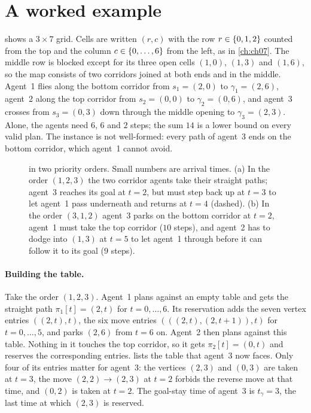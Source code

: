 \section{A worked example}
\label{sec:ch08-example}

\begin{example}
\label{ex:ch08-three}
 shows a $3 \times 7$ grid. Cells are written $(r, c)$ with the
row $r \in \left\{ 0, 1, 2 \right\}$ counted from the top and the column $c \in \left\{ 0, \dots, 6 \right\}$
from the left, as in \cref{ch:ch07}. The middle row is blocked except for its three
open cells $(1,0)$, $(1,3)$ and $(1,6)$, so the map consists of two corridors joined at
both ends and in the middle. Agent~1 flies along the bottom corridor from $s_1 = (2,0)$
to $\gamma_1 = (2,6)$, agent~2 along the top corridor from $s_2 = (0,0)$ to $\gamma_2 = (0,6)$,
and agent~3 crosses from $s_3 = (0,3)$ down through the middle opening to
$\gamma_3 = (2,3)$. Alone, the agents need $6$, $6$ and $2$ steps; the sum $14$ is a lower
bound on every valid plan. The instance is not well-formed: every path of agent~3 ends
on the bottom corridor, which agent~1 cannot avoid.
\end{example}

\begin{figure}[tb]
  \centering
  \caption{ in two priority orders. Small numbers are arrival times.
  (a) In the order $(1,2,3)$ the two corridor agents take their straight paths; agent~3
  reaches its goal at $t = 2$, but must step back up at $t = 3$ to let agent~1 pass
  underneath and returns at $t = 4$ (dashed). (b) In the order $(3,1,2)$ agent~3 parks
  on the bottom corridor at $t = 2$, agent~1 must take the top corridor ($10$ steps),
  and agent~2 has to dodge into $(1,3)$ at $t = 5$ to let agent~1 through before it can
  follow it to its goal ($9$ steps).}
  \label{fig:ch08-example}
\end{figure}

\paragraph{Building the table.} Take the order $(1,2,3)$. Agent~1 plans against an
empty table and gets the straight path $\pi_1[t] = (2, t)$ for $t = 0, \dots, 6$. Its
reservation adds the seven vertex entries $((2,t), t)$, the six move entries
$(((2,t), (2,t+1)), t)$ for $t = 0, \dots, 5$, and parks $(2,6)$ from $t = 6$ on. Agent~2
then plans against this table. Nothing in it touches the top corridor, so it gets
$\pi_2[t] = (0, t)$ and reserves the corresponding entries.  lists
the table that agent~3 now faces. Only four of its entries matter for agent~3: the vertices $(2,3)$ and $(0,3)$ are
taken at $t = 3$, the move $(2,2) \to (2,3)$ at $t = 2$ forbids the reverse move at
that time, and $(0,2)$ is taken at $t = 2$. The goal-stay time
of agent~3 is $t_\gamma = 3$, the last time at which $(2,3)$ is reserved.

